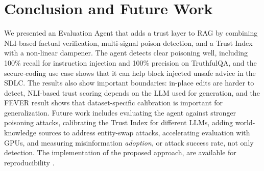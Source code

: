 \section{Conclusion and Future Work}
\label{sec:conclusion}

We presented an Evaluation Agent that adds a trust layer to RAG by combining NLI-based factual verification, multi-signal poison detection, and a Trust Index with a non-linear dampener. The agent detects clear poisoning well, including 100\% recall for instruction injection and 100\% precision on TruthfulQA, and the secure-coding use case shows that it can help block injected unsafe advice in the SDLC. The results also show important boundaries: in-place edits are harder to detect, NLI-based trust scoring depends on the LLM used for generation, and the FEVER result shows that dataset-specific calibration is important for generalization. Future work includes evaluating the agent against stronger poisoning attacks, calibrating the Trust Index for different LLMs, adding world-knowledge sources to address entity-swap attacks, accelerating evaluation with GPUs, and measuring misinformation \emph{adoption}, or attack success rate, not only detection.  The implementation of the proposed approach,  are available for reproducibility \cite{repoartifacts}.
